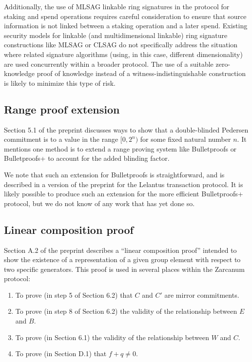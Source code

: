 \documentclass{article}
\begin{document}
Additionally, the use of MLSAG linkable ring signatures in the protocol for staking and spend operations requires careful consideration to ensure that source information is not linked between a staking operation and a later spend.
Existing security models for linkable (and multidimensional linkable) ring signature constructions like MLSAG or CLSAG \cite{clsag} do not specifically address the situation where related signature algorithms (using, in this case, different dimensionality) are used concurrently within a broader protocol.
The use of a suitable zero-knowledge proof of knowledge instead of a witness-indistinguishable construction is likely to minimize this type of risk.


\subsection{Range proof extension}
\label{obs:range}

Section 5.1 of the preprint discusses ways to show that a double-blinded Pedersen commitment is to a value in the range $[0,2^n)$ for some fixed natural number $n$.
It mentions one method is to extend a range proving system like Bulletproofs \cite{bp} or Bulletproofs+ \cite{bp_plus} to account for the added blinding factor.

We note that such an extension for Bulletproofs is straightforward, and is described in a version of the preprint for the Lelantus \cite{lelantus} transaction protocol.
It is likely possible to produce such an extension for the more efficient Bulletproofs+ protocol, but we do not know of any work that has yet done so.


\subsection{Linear composition proof}

Section A.2 of the preprint describes a ``linear composition proof'' intended to show the existence of a representation of a given group element with respect to two specific generators.
This proof is used in several places within the Zarcanum protocol:
\begin{enumerate}
	\item\label{item:mirror} To prove (in step 5 of Section 6.2) that $C$ and $C'$ are mirror commitments.
	\item\label{item:range} To prove (in step 8 of Section 6.2) the validity of the relationship between $E$ and $B$.
	\item To prove (in Section 6.1) the validity of the relationship between $W$ and $C$.
	\item To prove (in Section D.1) that $f + q \neq 0$.
\end{enumerate}
\end{document}
